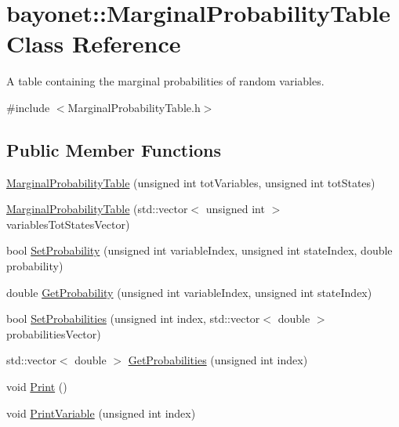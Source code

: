 \hypertarget{classbayonet_1_1_marginal_probability_table}{\section{bayonet\-:\-:Marginal\-Probability\-Table Class Reference}
\label{classbayonet_1_1_marginal_probability_table}
}


A table containing the marginal probabilities of random variables.  




{\ttfamily \#include $<$Marginal\-Probability\-Table.\-h$>$}

\subsection*{Public Member Functions}
\begin{DoxyCompactItemize}
\item 
\hyperlink{classbayonet_1_1_marginal_probability_table_aaf7f15ab1f5ed12d53722cb66b6eeed8}{Marginal\-Probability\-Table} (unsigned int tot\-Variables, unsigned int tot\-States)
\item 
\hyperlink{classbayonet_1_1_marginal_probability_table_aafec778bc82a3e6abb0ad05bd4fa6710}{Marginal\-Probability\-Table} (std\-::vector$<$ unsigned int $>$ variables\-Tot\-States\-Vector)
\item 
bool \hyperlink{classbayonet_1_1_marginal_probability_table_a2e5df9bbbc655d522199b4b87e4d46e3}{Set\-Probability} (unsigned int variable\-Index, unsigned int state\-Index, double probability)
\item 
double \hyperlink{classbayonet_1_1_marginal_probability_table_a5447f68ac26b7adadc801de7c1f5ffa7}{Get\-Probability} (unsigned int variable\-Index, unsigned int state\-Index)
\item 
bool \hyperlink{classbayonet_1_1_marginal_probability_table_a0bdf638395853225660615a0a847c741}{Set\-Probabilities} (unsigned int index, std\-::vector$<$ double $>$ probabilities\-Vector)
\item 
std\-::vector$<$ double $>$ \hyperlink{classbayonet_1_1_marginal_probability_table_aa97aabef18b97cdea29e0b74a5372d2e}{Get\-Probabilities} (unsigned int index)
\item 
void \hyperlink{classbayonet_1_1_marginal_probability_table_aca70cba427a713917d194b182e38ceb4}{Print} ()
\item 
void \hyperlink{classbayonet_1_1_marginal_probability_table_ac0d3f11940b2377eca44e9076d8de0ad}{Print\-Variable} (unsigned int index)
\end{DoxyCompactItemize}



